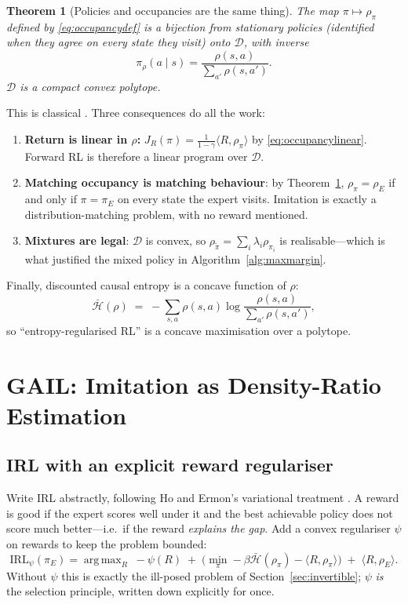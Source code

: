 \documentclass[11pt]{article}
\theoremstyle{plain}
\newtheorem{theorem}{Theorem}[section]
\theoremstyle{definition}
\theoremstyle{remark}
\DeclareMathOperator*{\argmax}{arg\,max}
\begin{document}
\begin{theorem}[Policies and occupancies are the same
thing]\label{thm:occbijection}
The map $\pi\mapsto\rho_\pi$ defined by \eqref{eq:occupancydef} is a
bijection from stationary policies (identified when they agree on every
state they visit) onto $\mathcal{D}$, with inverse
\begin{equation}
\pi_\rho(a\mid s) = \frac{\rho(s,a)}{\sum_{a'}\rho(s,a')}.
\label{eq:occinverse}
\end{equation}
$\mathcal{D}$ is a compact convex polytope.
\end{theorem}

This is classical \cite{puterman1994,syed2008}. Three consequences do all
the work:
\begin{enumerate}
\item \textbf{Return is linear in $\rho$:} $J_R(\pi) =
\frac1{1-\gamma}\langle R,\rho_\pi\rangle$ by \eqref{eq:occupancylinear}.
Forward RL is therefore a linear program over $\mathcal{D}$.
\item \textbf{Matching occupancy is matching behaviour}: by
Theorem~\ref{thm:occbijection}, $\rho_\pi=\rho_E$ if and only if
$\pi=\pi_E$ on every state the expert visits. Imitation is exactly a distribution-matching problem, with no
reward mentioned.
\item \textbf{Mixtures are legal}: $\mathcal{D}$ is convex, so
$\rho_{\tilde\pi} = \sum_i \lambda_i \rho_{\pi_i}$ is realisable---which is
what justified the mixed policy in Algorithm~\ref{alg:maxmargin}.
\end{enumerate}

Finally, discounted causal entropy is a concave function of $\rho$:
\begin{equation}
\bar{\mathcal{H}}(\rho) \;=\; -\sum_{s,a} \rho(s,a) \log\frac{\rho(s,a)}{\sum_{a'}\rho(s,a')},
\label{eq:occentropy}
\end{equation}
so ``entropy-regularised RL'' is a concave maximisation over a polytope.

\section{GAIL: Imitation as Density-Ratio Estimation}

\subsection{IRL with an explicit reward regulariser}

Write IRL abstractly, following Ho and Ermon's variational treatment
\cite{hoermon2016}. A reward is good if the expert scores well under it
and the best achievable policy does not score much better---i.e.\ if the
reward \emph{explains the gap}. Add a convex regulariser $\psi$ on rewards
to keep the problem bounded:
\begin{equation}
\mathrm{IRL}_\psi(\pi_E) = \argmax_R \; -\psi(R) \;+\; \Big(\min_\pi
-\beta\bar{\mathcal{H}}(\rho_\pi) - \langle R,\rho_\pi\rangle\Big) \;+\;
\langle R,\rho_E\rangle.
\label{eq:irlpsi}
\end{equation}
Without $\psi$ this is exactly the ill-posed problem of
Section~\ref{sec:invertible}; $\psi$ \emph{is} the selection principle,
written down explicitly for once.
\end{document}
